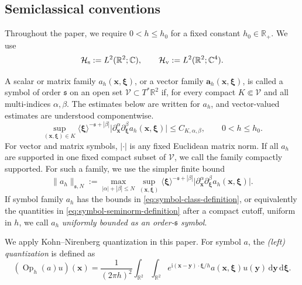 \documentclass[11pt,reqno]{amsart}
\newcommand{\ii}{\mathrm{i}}
\newcommand{\dd}{\,\mathrm{d}}
\newcommand{\Op}{\operatorname{Op}}
\numberwithin{equation}{section}
\begin{document}
 

\begin{appendix}

\section{Semiclassical conventions}\label{sec:semi-convention}
Throughout the paper, we require $0<h\le h_0$ for a fixed constant $h_0\in\mathbb{R}_+$. We use
\begin{equation*}
    \mathcal H_{\rm s}:=L^2(\mathbb R^2;\mathbb C),
    \qquad
    \mathcal H_{\rm v}:=L^2(\mathbb R^2;\mathbb C^4).
\end{equation*}

A scalar or matrix family $a_h(\bm x,\bm\xi)$, or a vector family $\bm a_h(\bm x,\bm\xi)$, is called a symbol of order $\mathfrak s$ on an open set $\mathcal V\subset T^*\mathbb R^2$ if, for every compact $K\Subset\mathcal V$ and all multi-indices $\alpha,\beta$. The estimates below are written for $a_h$, and vector-valued estimates are understood componentwise.
\begin{equation}\label{eq:symbol-class-definition}
 \sup_{(\bm x,\bm\xi)\in K}
 \langle\bm\xi\rangle^{-\mathfrak s+|\beta|}
 \bigl|\partial_{\bm x}^{\alpha}\partial_{\bm\xi}^{\beta}
 a_h(\bm x,\bm\xi)\bigr|
 \le C_{K,\alpha,\beta},
 \qquad 0<h\le h_0.
\end{equation}
For vector and matrix symbols, $|\cdot|$ is any fixed Euclidean matrix norm. If all $a_h$ are supported in one fixed compact subset of $\mathcal V$, we call the family compactly supported. For such a family, we use the simpler finite bound
\begin{equation}\label{eq:symbol-seminorm-definition}
 \|a_h\|_{\mathfrak s,N}:=
 \max_{|\alpha|+|\beta|\le N}
 \sup_{(\bm x,\bm\xi)}
 \langle\bm\xi\rangle^{-\mathfrak s+|\beta|}
 \bigl|\partial_{\bm x}^{\alpha}\partial_{\bm\xi}^{\beta}
 a_h(\bm x,\bm\xi)\bigr|.
\end{equation}
If symbol family $a_h$ has the bounds in \eqref{eq:symbol-class-definition}, or equivalently the quantities in \eqref{eq:symbol-seminorm-definition} after a compact cutoff, uniform in $h$, we call $a_h$ \emph{uniformly bounded as an order-$\mathfrak s$ symbol}. 

We apply Kohn--Nirenberg quantization in this paper. For symbol $a$, the \emph{(left) quantization} is defined as
$$
    (\Op_h(a)u)(\bm{x}) = \frac{1}{(2\pi h)^2}\int_{\mathbb{R}^2}\int_{\mathbb{R}^2} e^{\ii(\bm{x}-\bm{y})\cdot\bm{\xi}/h}a(\bm{x},\bm{\xi})u(\bm{y})\dd\bm{y}\dd\bm{\xi}.
$$


\end{appendix}
\end{document}
